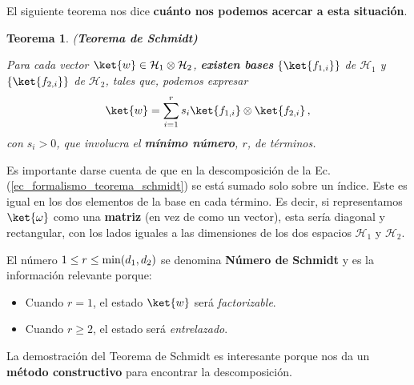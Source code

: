 \documentclass[a4paper,11pt]{book} %
\newtheorem{teorema_contador}{Teorema}
\newcommand{\Teorema}[1]{
		\begin{mybox_gray2}{}
			\begin{teorema_contador}
				 #1 
			\end{teorema_contador} 
		\end{mybox_gray2}
	}
\numberwithin{equation}{chapter}
\begin{document}
El siguiente teorema nos dice \textbf{cuánto nos podemos acercar a esta situación}.

	\Teorema{ (\textbf{Teorema de Schmidt)} 
	
	Para cada vector $\ket{w}\in \mathcal{H}_1\otimes \mathcal{H}_2$, \textbf{existen  bases } $\{\ket{f_{1,i}}\}$  de $\mathcal{H}_1$ y  $\{\ket{f_{2,i}}\}$  de $\mathcal{H}_2$, tales que, podemos expresar 
		\begin{equation} \label{ec_formalismo_teorema_schmidt}
		\ket{w} = \sum_{i=1}^r s_i \ket{f_{1,i}}\otimes\ket{f_{2,i}} \, ,
		\end{equation}
	 con $s_i>0$, que   involucra el \textbf{mínimo número}, $r$, de términos.
	}

Es importante darse cuenta de que en la descomposición de la Ec. (\ref{ec_formalismo_teorema_schmidt}) se está sumado solo sobre un índice. Este es igual en los dos elementos de la base en cada término. Es decir, si representamos $\ket{\omega}$ como una \textbf{matriz} (en vez de como un vector), esta sería diagonal y rectangular, con los lados iguales a las dimensiones de los dos espacios $\mathcal{H}_1$ y $\mathcal{H}_2$.

El número $1\leq r\leq {\rm min}(d_1,d_2)$ se denomina \textbf{Número de Schmidt} y  es la información relevante  porque:
\begin{itemize}
	\item Cuando $r=1$, el estado $\ket{w}$ será \textit{factorizable}.
	\item Cuando $r\geq 2$, el estado será \textit{entrelazado}.
\end{itemize}

	La demostración del Teorema de Schmidt es interesante porque nos da un \textbf{método constructivo} para encontrar la descomposición. 
\end{document}
